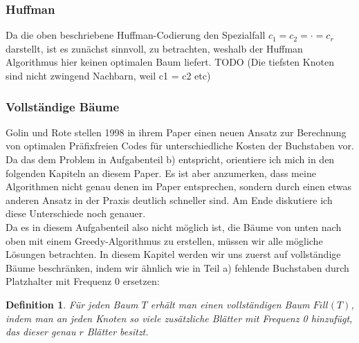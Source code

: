 \documentclass[a4paper,10pt,ngerman]{scrartcl}
\newtheorem{definition}[satz]{Definition}
\begin{document}
    \subsubsection{Huffman}
    Da die oben beschriebene Huffman-Codierung den Spezialfall $c_1 = c_2 = \cdot = c_r$ darstellt, ist es zunächst sinnvoll, zu betrachten, weshalb der Huffman Algorithmus hier keinen optimalen Baum liefert.
    TODO (Die tiefsten Knoten sind nicht zwingend Nachbarn, weil c1 = c2 etc)

    \subsubsection{Vollständige Bäume}
    Golin und Rote stellen 1998 in ihrem Paper \cite{golin_dynamic_1998} einen neuen Ansatz zur Berechnung von optimalen Präfixfreien Codes für unterschiedliche Kosten der Buchstaben vor.
    Da das dem Problem in Aufgabenteil b) entspricht, orientiere ich mich in den folgenden Kapiteln an diesem Paper.
    Es ist aber anzumerken, dass meine Algorithmen nicht genau denen im Paper entsprechen, sondern durch einen etwas anderen Ansatz in der Praxis deutlich schneller sind.
    Am Ende diskutiere ich diese Unterschiede noch genauer.\\
    Da es in diesem Aufgabenteil also nicht möglich ist, die Bäume von unten nach oben mit einem Greedy-Algorithmus zu erstellen, müssen wir alle mögliche Lösungen betrachten.
    In diesem Kapitel werden wir uns zuerst auf vollständige Bäume beschränken, indem wir ähnlich wie in Teil a) fehlende Buchstaben durch Platzhalter mit Frequenz 0 ersetzen:
    \begin{definition}
        Für jeden Baum $T$ erhält man einen vollständigen Baum $Fill(T)$, indem man an jeden Knoten so viele zusätzliche Blätter mit Frequenz 0 hinzufügt, das dieser genau $r$ Blätter besitzt.
    \end{definition}
\end{document}
